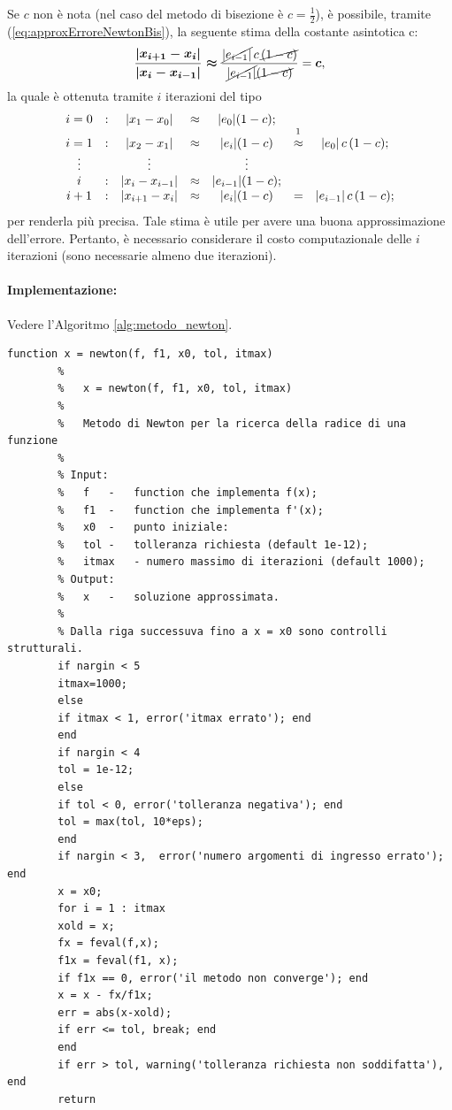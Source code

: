 Se $c$ non è nota (nel caso del metodo di bisezione è $c=\frac{1}{2}$), è possibile, tramite (\ref{eq:approxErroreNewtonBis}), la seguente stima della costante asintotica c:
\begin{equation*}
	\boldsymbol{\frac{|x_{i+1}-x_i|}{|x_i-x_{i-1}|}\approx}\frac{\cancel{|e_{i-1}|}\,c\,\cancel{(1-c)}}{\cancel{|e_{i-1}|}\cancel{(1-c)}}=\boldsymbol c,
\end{equation*}
la quale è ottenuta tramite $i$ iterazioni del tipo
\begin{equation*}
	\begin{matrix}
		i=0 &:& |x_1-x_0|&\approx& |e_0|(1-c);\\
		i=1 &:& |x_2-x_1|&\approx&|e_i|(1-c)&\overset{\footnotemark}{\approx}&|e_0|\, c\, (1-c);\\
		\vdots & & \vdots & & \vdots \\
		i &:&|x_i-x_{i-1}|&\approx& |e_{i-1}|(1-c);\\
		i+1 &:&|x_{i+1}-x_i|&\approx& |e_i|(1-c) &=& |e_{i-1}|\, c\, (1-c);
	\end{matrix}
\end{equation*}
per renderla più precisa. Tale stima è utile per avere una buona  approssimazione dell'errore. Pertanto, è necessario considerare il costo computazionale delle $i$ iterazioni (sono necessarie almeno due iterazioni).

\paragraph{Implementazione:} Vedere l'Algoritmo \ref{alg:metodo_newton}.

\begin{algorithm}
	\caption{Implementazione efficiente del metodo di Newton.}\label{alg:metodo_newton}
	\begin{lstlisting}[style=Matlab-editor]
		function x = newton(f, f1, x0, tol, itmax)
		%   
		%   x = newton(f, f1, x0, tol, itmax)
		%
		%   Metodo di Newton per la ricerca della radice di una funzione
		%
		% Input:
		%   f   -   function che implementa f(x);
		%   f1  -   function che implementa f'(x);
		%   x0  -   punto iniziale:
		%   tol -   tolleranza richiesta (default 1e-12);
		%   itmax   - numero massimo di iterazioni (default 1000);
		% Output:
		%   x   -   soluzione approssimata.
		%
		% Dalla riga successuva fino a x = x0 sono controlli strutturali.
		if nargin < 5
		itmax=1000;
		else
		if itmax < 1, error('itmax errato'); end
		end
		if nargin < 4 
		tol = 1e-12;
		else
		if tol < 0, error('tolleranza negativa'); end
		tol = max(tol, 10*eps);
		end
		if nargin < 3,  error('numero argomenti di ingresso errato'); end
		x = x0;
		for i = 1 : itmax
		xold = x;
		fx = feval(f,x);
		f1x = feval(f1, x);
		if f1x == 0, error('il metodo non converge'); end
		x = x - fx/f1x;
		err = abs(x-xold);
		if err <= tol, break; end
		end
		if err > tol, warning('tolleranza richiesta non soddifatta'), end
		return
	\end{lstlisting}
\end{algorithm}

